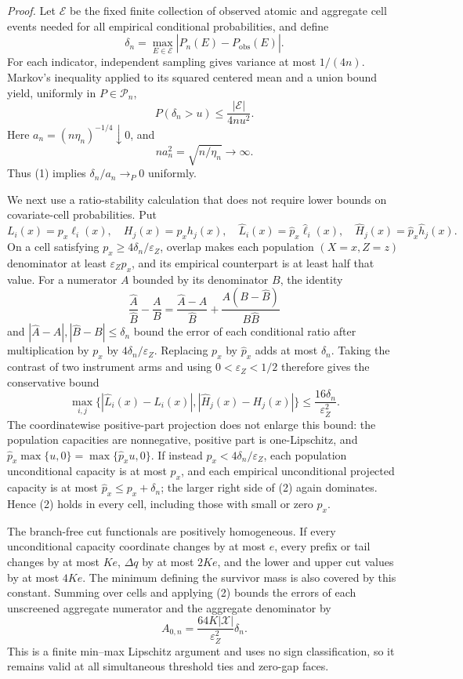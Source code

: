 \noindent\textit{Proof.}
Let \(\mathcal E\) be the fixed finite collection of observed atomic and
aggregate cell events needed for all empirical conditional probabilities,
and define
\[
\delta_n=\max_{E\in\mathcal E}
|\widehat P_n(E)-P_{\mathrm{obs}}(E)|.
\]
For each indicator, independent sampling gives variance at most
\(1/(4n)\).  Markov's inequality applied to its squared centered mean and
a union bound yield, uniformly in \(P\in\mathcal P_n\),
\[
P(\delta_n>u)\le\frac{|\mathcal E|}{4nu^2}.
\tag{1}
\]
Here \(a_n=(n\eta_n)^{-1/4}\downarrow0\), and
\[
na_n^2=\sqrt{n/\eta_n}\longrightarrow\infty.
\]
Thus (1) implies \(\delta_n/a_n\to_P0\) uniformly.

We next use a ratio-stability calculation that does not require lower
bounds on covariate-cell probabilities.  Put
\[
L_i(x)=p_x\ell_i(x),\quad H_j(x)=p_xh_j(x),\quad
\widehat L_i(x)=\widehat p_x\widehat\ell_i(x),\quad
\widehat H_j(x)=\widehat p_x\widehat h_j(x).
\]
On a cell satisfying \(p_x\ge4\delta_n/\varepsilon_Z\), overlap makes
each population \((X=x,Z=z)\) denominator at least
\(\varepsilon_Zp_x\), and its empirical counterpart is at least half
that value.  For a numerator \(A\) bounded by its denominator \(B\), the
identity
\[
\frac{\widehat A}{\widehat B}-\frac AB
=\frac{\widehat A-A}{\widehat B}
+\frac{A(B-\widehat B)}{B\widehat B}
\]
and \(|\widehat A-A|,|\widehat B-B|\le\delta_n\) bound the error of each
conditional ratio after multiplication by \(p_x\) by
\(4\delta_n/\varepsilon_Z\).  Replacing \(p_x\) by \(\widehat p_x\)
adds at most \(\delta_n\).  Taking the contrast of two instrument arms
and using \(0<\varepsilon_Z<1/2\) therefore gives the conservative bound
\[
\max_{i,j}\{|\widehat L_i(x)-L_i(x)|,
             |\widehat H_j(x)-H_j(x)|\}
\le\frac{16\delta_n}{\varepsilon_Z^2}.
\tag{2}
\]
The coordinatewise positive-part projection does not enlarge this bound:
the population capacities are nonnegative, positive part is
one-Lipschitz, and
\(\widehat p_x\max\{u,0\}=\max\{\widehat p_xu,0\}\).  If instead
\(p_x<4\delta_n/\varepsilon_Z\), each population unconditional capacity
is at most \(p_x\), and each empirical unconditional projected capacity
is at most \(\widehat p_x\le p_x+\delta_n\); the larger right side of (2)
again dominates.  Hence (2) holds in every cell, including those with
small or zero \(p_x\).

The branch-free cut functionals are positively homogeneous.  If every
unconditional capacity coordinate changes by at most \(e\), every prefix
or tail changes by at most \(Ke\), \(\Delta q\) by at most \(2Ke\), and
the lower and upper cut values by at most \(4Ke\).  The minimum defining
the survivor mass is also covered by this constant.  Summing over cells
and applying (2) bounds the errors of each unscreened aggregate numerator
and the aggregate denominator by
\[
A_{0,n}=\frac{64K|\mathcal X|}{\varepsilon_Z^2}\delta_n.
\tag{3}
\]
This is a finite min--max Lipschitz argument and uses no sign
classification, so it remains valid at all simultaneous threshold ties
and zero-gap faces.


